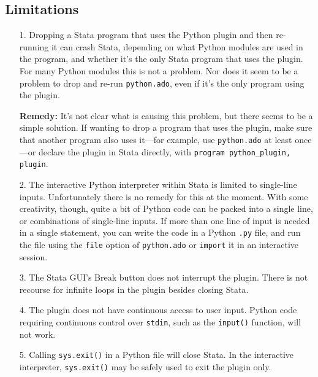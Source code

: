\documentclass{article}
\begin{document}
	\subsection{Limitations} \label{limitations}
	
		\begin{enumerate}
			\item[1.] Dropping a Stata program that uses the Python plugin and then re-running it can crash Stata, depending on what Python modules are used in the program, and whether it's the only Stata program that uses the plugin. For many Python modules this is not a problem. Nor does it seem to be a problem to drop and re-run \lstinline{python.ado}, even if it's the only program using the plugin.
			
			\textbf{Remedy:} It's not clear what is causing this problem, but there seems to be a simple solution. If wanting to drop a program that uses the plugin, make sure that another program also uses it---for example, use \lstinline{python.ado} at least once---or declare the plugin in Stata directly, with \lstinline{program python_plugin, plugin}.
			
			\item[2.] The interactive Python interpreter within Stata is limited to single-line inputs. Unfortunately there is no remedy for this at the moment. With some creativity, though, quite a bit of Python code can be packed into a single line, or combinations of single-line inputs. If more than one line of input is needed in a single statement, you can write the code in a Python \lstinline{.py} file, and run the file using the \lstinline{file} option of \lstinline{python.ado} or \lstinline{import} it in an interactive session.
			
			\item[3.] The Stata \textsc{GUI}'s Break button does not interrupt the plugin. There is not recourse for infinite loops in the plugin besides closing Stata.
			
			\item[4.] The plugin does not have continuous access to user input. Python code requiring continuous control over \lstinline{stdin}, such as the \lstinline{input()} function, will not work.
			
			\item[5.] Calling \lstinline{sys.exit()} in a Python file will close Stata. In the interactive interpreter, \lstinline{sys.exit()} may be safely used to exit the plugin only.
		\end{enumerate}
\end{document}
